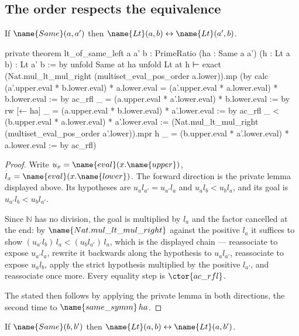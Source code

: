 \subsection{The order respects the equivalence}

\begin{lemma}
\label{Order:lem:left}
If $\name{Same}(a, a')$ then $\name{Lt}(a,b) \leftrightarrow \name{Lt}(a',b)$.
\end{lemma}

\begin{leancode}
private theorem lt_of_same_left {a a' b : PrimeRatio}
    (ha : Same a a') (h : Lt a b) : Lt a' b := by
  unfold Same at ha
  unfold Lt at h ⊢
  exact (Nat.mul_lt_mul_right (multiset_eval_pos_order a.lower)).mp (by
    calc
      (a'.upper.eval * b.lower.eval) * a.lower.eval
          = (a'.upper.eval * a.lower.eval) * b.lower.eval := by ac_rfl
      _ = (a.upper.eval * a'.lower.eval) * b.lower.eval := by rw [← ha]
      _ = (a.upper.eval * b.lower.eval) * a'.lower.eval := by ac_rfl
      _ < (b.upper.eval * a.lower.eval) * a'.lower.eval :=
          (Nat.mul_lt_mul_right (multiset_eval_pos_order a'.lower)).mpr h
      _ = (b.upper.eval * a'.lower.eval) * a.lower.eval := by ac_rfl)
\end{leancode}

\begin{proof}
Write $u_x = \name{eval}(x.\name{upper})$, $l_x = \name{eval}(x.\name{lower})$.
The forward direction is the private lemma 
displayed above.  Its hypotheses are $u_a l_{a'} = u_{a'} l_a$ and
$u_a l_b < u_b l_a$, and its goal is $u_{a'} l_b < u_b l_{a'}$.

Since $\mathbb{N}$ has no division, the goal is multiplied by $l_a$ and the
factor cancelled at the end: by $\name{Nat.mul\_lt\_mul\_right}$ against the
positive $l_a$ it suffices to show
$(u_{a'} l_b)\,l_a < (u_b l_{a'})\,l_a$, which is the displayed chain ---
reassociate to expose $u_{a'} l_a$, rewrite it backwards along the hypothesis
to $u_a l_{a'}$, reassociate to expose $u_a l_b$, apply the strict hypothesis
multiplied by the positive $l_{a'}$, and reassociate once more.  Every
equality step is $\ctor{ac\_rfl}$.

The stated  then follows by applying the private lemma in both
directions, the second time to $\name{same\_symm}\,ha$.
\end{proof}

\begin{lemma}
\label{Order:lem:right}
If $\name{Same}(b, b')$ then $\name{Lt}(a,b) \leftrightarrow \name{Lt}(a,b')$.
\end{lemma}

